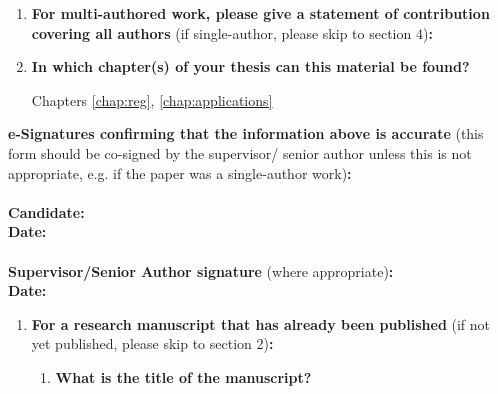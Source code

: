 {\begin{enumerate}[leftmargin=*,label={\bfseries\arabic*.}]
\item \textbf{For multi-authored work, please give a statement of contribution covering all authors} (if single-author, please skip to section 4)\textbf{:}
\item \textbf{In which chapter(s) of your thesis can this material be found?}

Chapters \ref{chap:reg}, \ref{chap:applications}

\end{enumerate}

\textbf{e-Signatures confirming that the information above is accurate}
(this form should be co-signed by the supervisor/ senior author unless this is not appropriate, e.g. if the paper was a single-author work)\textbf{:}\\
\textbf{}\\
\textbf{Candidate:}\\
\textbf{Date:}\\
\textbf{}\\
\textbf{Supervisor/Senior Author signature} (where appropriate)\textbf{:}\\
\textbf{Date:}
%

\newpage
\begin{enumerate}[leftmargin=*,label={\bfseries\arabic*.}]\itemsep0em
%
\item \textbf{For a research manuscript that has already been published} (if not yet published, please skip to section 2)\textbf{:}
%
\begin{enumerate}[label={\alph*)}]\itemsep0em
	\item \textbf{What is the title of the manuscript?}


\end{enumerate}
\end{enumerate}}
